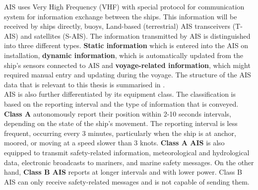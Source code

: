 AIS uses Very High Frequency (VHF) with special protocol for communication system for information exchange between the ships. This information will be received by ships directly, buoys, Land-based (terrestrial) AIS transceivers (T-AIS) and satellites (S-AIS). The information transmitted by AIS is distinguished into three different types. \textbf{Static information} which is entered into the AIS on installation, \textbf{dynamic information}, which is automatically updated from the ship's sensors connected to AIS and \textbf{voyage-related information}, which might required manual entry and updating during the voyage. The structure of the AIS data that is relevant to this thesis is summarised in .\\

AIS is also further differentiated by its equipment class. The classification is based on the reporting interval and the type of information that is conveyed. \textbf{Class A} autonomously report their position within 2-10 seconds intervals, depending on the state of the ship's movement. The reporting interval is less frequent, occurring every 3 minutes, particularly when the ship is at anchor, moored, or moving at a speed slower than 3 knots. \textbf{Class A AIS} is also equipped to transmit safety-related information, meteorological and hydrological data, electronic broadcasts to mariners, and marine safety messages.  On the other hand, \textbf{Class B AIS} reports at longer intervals and with lower power. Class B AIS can only receive safety-related messages and is not capable of sending them. 

